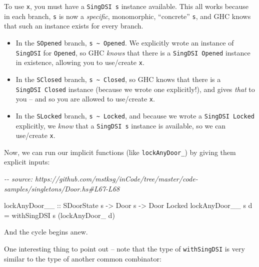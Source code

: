 \documentclass[]{article}
\newenvironment{Shaded}{}{}
\newcommand{\CommentTok}[1]{\textcolor[rgb]{0.38,0.63,0.69}{\textit{#1}}}
\newcommand{\DataTypeTok}[1]{\textcolor[rgb]{0.56,0.13,0.00}{#1}}
\newcommand{\FunctionTok}[1]{\textcolor[rgb]{0.02,0.16,0.49}{#1}}
\newcommand{\NormalTok}[1]{#1}
\newcommand{\OtherTok}[1]{\textcolor[rgb]{0.00,0.44,0.13}{#1}}
\begin{document}
To use \texttt{x}, you must have a \texttt{SingDSI\ s} instance available. This
all works because in each branch, \texttt{s} is now a \emph{specific},
monomorphic, ``concrete'' \texttt{s}, and GHC knows that such an instance exists
for every branch.

\begin{itemize}
\tightlist
\item
  In the \texttt{SOpened} branch,
  \texttt{s\ \textasciitilde{}\ \textquotesingle{}Opened}. We explicitly wrote
  an instance of \texttt{SingDSI} for \texttt{\textquotesingle{}Opened}, so GHC
  \emph{knows} that there is a \texttt{SingDSI\ \textquotesingle{}Opened}
  instance in existence, allowing you to use/create \texttt{x}.
\item
  In the \texttt{SClosed} branch,
  \texttt{s\ \textasciitilde{}\ \textquotesingle{}Closed}, so GHC knows that
  there is a \texttt{SingDSI\ \textquotesingle{}Closed} instance (because we
  wrote one explicitly!), and gives \emph{that} to you -- and so you are allowed
  to use/create \texttt{x}.
\item
  In the \texttt{SLocked} branch,
  \texttt{s\ \textasciitilde{}\ \textquotesingle{}Locked}, and because we wrote
  a \texttt{SingDSI\ \textquotesingle{}Locked} explicitly, we \emph{know} that a
  \texttt{SingDSI\ s} instance is available, so we can use/create \texttt{x}.
\end{itemize}

Now, we can run our implicit functions (like \texttt{lockAnyDoor\_}) by giving
them explicit inputs:

\begin{Shaded}
\begin{Highlighting}[]
\CommentTok{{-}{-} source: https://github.com/mstksg/inCode/tree/master/code{-}samples/singletons/Door.hs\#L67{-}L68}

\OtherTok{lockAnyDoor\_\_ ::} \DataTypeTok{SDoorState}\NormalTok{ s }\OtherTok{{-}>} \DataTypeTok{Door}\NormalTok{ s }\OtherTok{{-}>} \DataTypeTok{Door} \DataTypeTok{\textquotesingle{}Locked}
\NormalTok{lockAnyDoor\_\_ s d }\OtherTok{=}\NormalTok{ withSingDSI s (lockAnyDoor\_ d)}
\end{Highlighting}
\end{Shaded}

And the cycle begins anew.

One interesting thing to point out -- note that the type of \texttt{withSingDSI}
is very similar to the type of another common combinator:

\begin{Shaded}
\end{Shaded}
\end{document}
